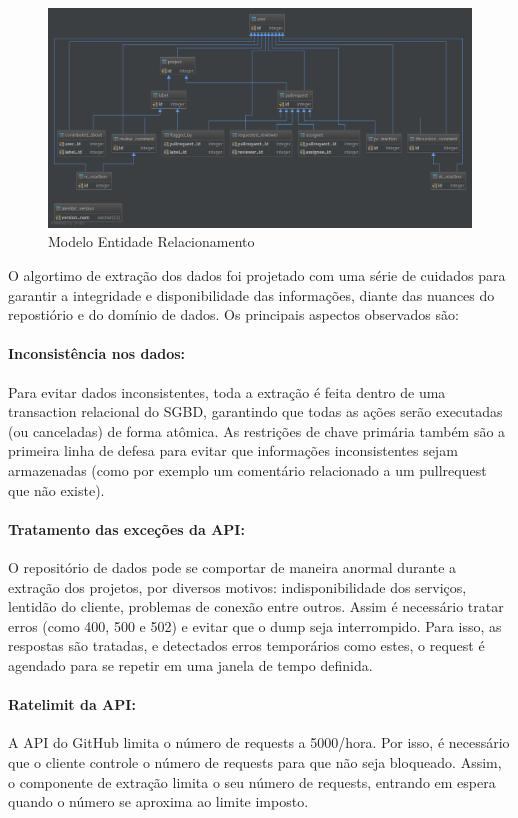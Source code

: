 \documentclass[sigconf]{acmart}
\begin{document}
\begin{figure}[!htbp]
 \includegraphics[width=\textwidth]{mer}
 \caption{Modelo Entidade Relacionamento}\label{fig:mer}
\end{figure}

O algortimo de extração dos dados foi projetado com uma série de cuidados para garantir a integridade e disponibilidade das informações, diante das nuances do repostiório e do domínio de dados. Os principais aspectos observados são:

\paragraph{Inconsistência nos dados: } Para evitar dados inconsistentes, toda a extração é feita dentro de uma transaction relacional do SGBD, garantindo que todas as ações serão executadas (ou canceladas) de forma atômica. As restrições de chave primária também são a primeira linha de defesa para evitar que informações inconsistentes sejam armazenadas (como por exemplo um comentário relacionado a um pullrequest que não existe).

\paragraph{Tratamento das exceções da API: } O repositório de dados pode se comportar de maneira anormal durante a extração dos projetos, por diversos motivos: indisponibilidade dos serviços, lentidão do cliente, problemas de conexão entre outros. Assim é necessário tratar erros (como 400, 500 e 502) e evitar que o dump seja interrompido. Para isso, as respostas são tratadas, e detectados erros temporários como estes, o request é agendado para se repetir em uma janela de tempo definida.

\paragraph{Ratelimit da API: } A API do GitHub limita o número de requests a 5000/hora. Por isso, é necessário que o cliente controle o número de requests para que não seja bloqueado. Assim, o componente de extração limita o seu número de requests, entrando em espera quando o número se aproxima ao limite imposto.
\end{document}
